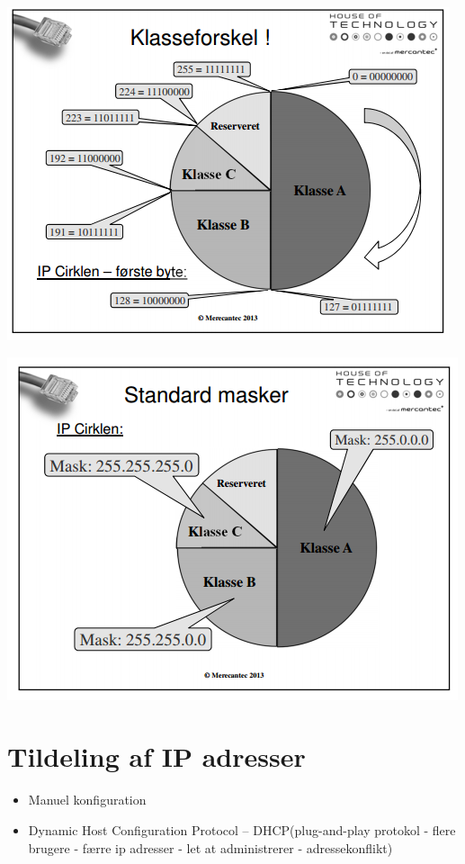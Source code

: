 {{{{{{\begin{center}
  \includegraphics{4-network-layer/klasseforskel.png}
\end{center}
{\includegraphics{4-network-layer/masker.png}

\section{Tildeling af IP adresser}
\begin{itemize}
	\item Manuel konfiguration
	\item Dynamic Host Configuration Protocol – DHCP(plug-and-play protokol - flere brugere - færre ip adresser - let at administrerer - adressekonflikt)
\end{itemize}

}}}}}}}

